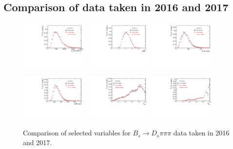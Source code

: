 \clearpage
\subsection*{Comparison of data taken in 2016 and 2017}
\label{ssec:16vs17}

\begin{figure}[h]
\centering
\includegraphics[height=!,width=0.3\textwidth]{figs/dataVsMC/year16vs17_norm/Ds2all_Bs_PT.pdf}
\includegraphics[height=!,width=0.3\textwidth]{figs/dataVsMC/year16vs17_norm/Ds2all_Bs_ETA.pdf}
\includegraphics[height=!,width=0.3\textwidth]{figs/dataVsMC/year16vs17_norm/Ds2all_NTracks.pdf}


\includegraphics[height=!,width=0.3\textwidth]{figs/dataVsMC/year16vs17_norm/Ds2all_Bs_BsDTF_TAUERR.pdf}
\includegraphics[height=!,width=0.3\textwidth]{figs/dataVsMC/year16vs17_norm/Ds2all_OS_Combination_PROB.pdf}
\includegraphics[height=!,width=0.3\textwidth]{figs/dataVsMC/year16vs17_norm/Ds2all_SS_Kaon_PROB.pdf}

\caption{Comparison of selected variables for $B_s \to D_s \pi \pi \pi$ data taken in 2016 and 2017.}
\label{fig:Norm_16v17}
\end{figure}

